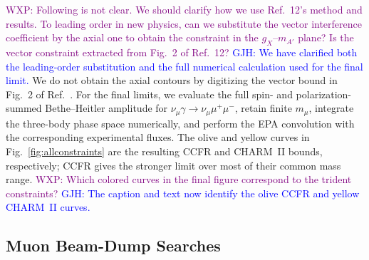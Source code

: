 \documentclass[onecolumn, aps, nofootinbib, prd, preprint, floats, floatfix, amsmath, amssymb, superscriptaddress, preprintnumbers]{revtex4-2}
\newcommand{\GJH}[1]{\textcolor{blue}{GJH: #1}}
\newcommand{\WXP}[1]{\textcolor{purple}{WXP: #1}}
\begin{document}
\WXP{Following is not clear. We should clarify how we use Ref.~12's method and results. To leading order in new physics, can we substitute the vector interference coefficient by the axial one to obtain the constraint in the $g_X$--$m_{A'}$ plane? Is the vector constraint extracted from Fig.~2 of Ref.~12?}
\GJH{We have clarified both the leading-order substitution and the full numerical calculation used for the final limit.}
We do not obtain the axial contours by digitizing the vector bound in Fig.~2 of Ref.~\cite{Altmannshofer:2014pba}. For the final limits, we evaluate the full spin- and polarization-summed Bethe--Heitler amplitude for $\nu_\mu\gamma\to\nu_\mu\mu^+\mu^-$, retain finite $m_\mu$, integrate the three-body phase space numerically, and perform the EPA convolution with the corresponding experimental fluxes. The olive and yellow curves in Fig.~\ref{fig:allconstraints} are the resulting CCFR and CHARM~II bounds, respectively; CCFR gives the stronger limit over most of their common mass range.
\WXP{Which colored curves in the final figure correspond to the trident constraints?}
\GJH{The caption and text now identify the olive CCFR and yellow CHARM~II curves.}

\subsection{Muon Beam-Dump Searches}
\label{subsec:muon-beam-dump}
\end{document}
